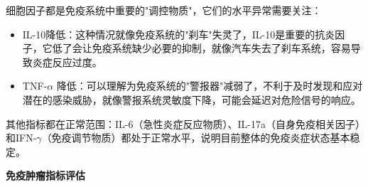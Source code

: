 \documentclass[UTF8]{ctexart}
\begin{document}
\begin{center}
\end{center}



\begin{tcolorbox}[
    enhanced,
    colback=gray!3,
    colframe=gray!3,
    arc=3mm,
    boxrule=0pt,
    width=\textwidth,
    top=8pt,
    bottom=8pt
]
{\small{\textcolor{yellow!85!orange}{\faBell}}\quad 细胞因子都是免疫系统中重要的"调控物质"，它们的水平异常需要关注：
\begin{itemize}
    \item IL-10降低：这种情况就像免疫系统的"刹车"失灵了，IL-10是重要的抗炎因子，它低了会让免疫系统缺少必要的抑制，就像汽车失去了刹车系统，容易导致炎症反应过度。
    \item TNF-$\alpha$ 降低：可以理解为免疫系统的"警报器"减弱了，不利于及时发现和应对潜在的感染威胁，就像警报系统灵敏度下降，可能会延迟对危险信号的响应。
\end{itemize}
\textcolor{customGreen}{\faBell}\quad 其他指标都在正常范围：IL-6（急性炎症反应物质）、IL-17a（自身免疫相关因子）和IFN-$\gamma$（免疫调节物质）都处于正常水平，说明目前整体的免疫炎症状态基本稳定。
}

\end{tcolorbox}

\newpage

\begin{tcolorbox}[
    enhanced,
    colback=white,
    colframe=white,
    arc=2mm,
    boxrule=0pt,
    width=\textwidth,
    left=15pt,
    right=15pt,
    top=10pt,
    bottom=10pt,
    drop shadow={
        opacity=0.2,
        color=customTeal
    },
    borderline west={5pt}{0pt}{customTeal}
]
\textcolor{customTeal}{\Large\textbf{免疫肿瘤指标评估}}
\end{tcolorbox}
\end{document}
